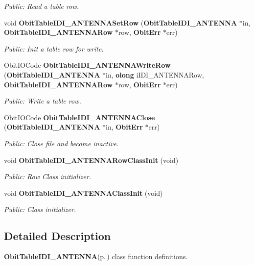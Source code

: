 \begin{CompactItemize}
\begin{CompactList}\small\item\em Public: Read a table row. \item\end{CompactList}\item 
void {\bf Obit\-Table\-IDI\_\-ANTENNASet\-Row} ({\bf Obit\-Table\-IDI\_\-ANTENNA} $\ast$in, {\bf Obit\-Table\-IDI\_\-ANTENNARow} $\ast$row, {\bf Obit\-Err} $\ast$err)
\begin{CompactList}\small\item\em Public: Init a table row for write. \item\end{CompactList}\item 
Obit\-IOCode {\bf Obit\-Table\-IDI\_\-ANTENNAWrite\-Row} ({\bf Obit\-Table\-IDI\_\-ANTENNA} $\ast$in, {\bf olong} i\-IDI\_\-ANTENNARow, {\bf Obit\-Table\-IDI\_\-ANTENNARow} $\ast$row, {\bf Obit\-Err} $\ast$err)
\begin{CompactList}\small\item\em Public: Write a table row. \item\end{CompactList}\item 
Obit\-IOCode {\bf Obit\-Table\-IDI\_\-ANTENNAClose} ({\bf Obit\-Table\-IDI\_\-ANTENNA} $\ast$in, {\bf Obit\-Err} $\ast$err)
\begin{CompactList}\small\item\em Public: Close file and become inactive. \item\end{CompactList}\item 
void {\bf Obit\-Table\-IDI\_\-ANTENNARow\-Class\-Init} (void)
\begin{CompactList}\small\item\em Public: Row Class initializer. \item\end{CompactList}\item 
void {\bf Obit\-Table\-IDI\_\-ANTENNAClass\-Init} (void)
\begin{CompactList}\small\item\em Public: Class initializer. \item\end{CompactList}\end{CompactItemize}


\subsection{Detailed Description}
{\bf Obit\-Table\-IDI\_\-ANTENNA}{\rm (p.\,\pageref{structObitTableIDI__ANTENNA})} class function definitions. 

